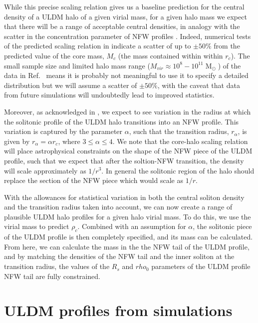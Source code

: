 \documentclass[a4paper,11pt]{article}
\begin{document}
While this precise scaling relation gives us a baseline prediction for the central density of a ULDM halo of a given virial mass, for a given halo mass we expect that there will be a range of acceptable central densities, in analogy with the scatter in the concentration parameter of NFW profiles \cite{Maccio:2008pcd}. Indeed, numerical tests of the predicted scaling relation in \cite{Schive:2014hza} indicate a scatter of up to $\pm 50\%$ from the predicted value of the core mass, $M_c$ (the mass contained within  within $r_c$). The small sample size and limited halo mass range ($ M_{vir} \approx 10^8-10^{11} \operatorname{M}_{\odot}$)  of the data in Ref.~\cite{Schive:2014hza} means it is probably not meaningful to use it to specify a detailed distribution but we will assume a scatter of $\pm 50\%$, with the caveat that data from future simulations will undoubtedly lead to improved statistics.

Moreover, as acknowledged in \cite{Robles:2018fur}, we expect to see variation in the radius at which the solitonic profile of the ULDM halo transitions into an NFW profile. This variation is captured by the parameter $\alpha$, such that the transition radius, $r_{\alpha}$, is given by $r_{\alpha} = \alpha r_c$, where $3 \leq \alpha \leq 4$. We note that the core-halo scaling relation will place astrophysical constraints on the shape of the NFW piece of the ULDM profile, such that we expect that after the soltion-NFW transition, the density will scale approximately as $1/r^3$. In general the solitonic region of the halo should replace the section of the NFW piece which would scale as $1/r$.  


With the allowances for statistical variation in both the central soliton density and the transition radius taken into account, we can now create a range of plausible ULDM halo profiles for a given halo virial mass. To do this, we use the virial mass to predict $\rho_c$. Combined with an assumption for $\alpha$, the solitonic piece of the ULDM profile is then completely specified, and its mass can be calculated. From here, we can calculate the mass in the the NFW tail of the ULDM profile, and by matching the densities of the NFW tail and the inner soliton at the transition radius, the values of the $R_s$ and $rho_0$ parameters of the ULDM profile NFW tail are fully constrained.  



\section{ULDM profiles from simulations}\label{sec:sim_comparison}
\end{document}
